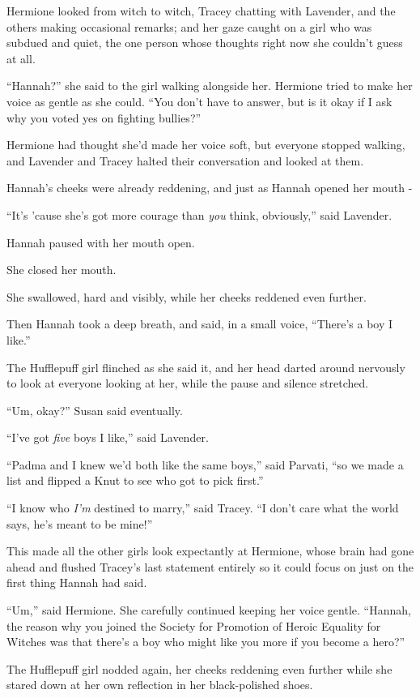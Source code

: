 Hermione looked from witch to witch, Tracey chatting with Lavender, and the others making occasional remarks; and her gaze caught on a girl who was subdued and quiet, the one person whose thoughts right now she couldn't guess at all.

``Hannah?'' she said to the girl walking alongside her. Hermione tried to make her voice as gentle as she could. ``You don't have to answer, but is it okay if I ask why you voted yes on fighting bullies?''

Hermione had thought she'd made her voice soft, but everyone stopped walking, and Lavender and Tracey halted their conversation and looked at them.

Hannah's cheeks were already reddening, and just as Hannah opened her mouth -

``It's 'cause she's got more courage than \emph{you} think, obviously,'' said Lavender.

Hannah paused with her mouth open.

She closed her mouth.

She swallowed, hard and visibly, while her cheeks reddened even further.

Then Hannah took a deep breath, and said, in a small voice, ``There's a boy I like.''

The Hufflepuff girl flinched as she said it, and her head darted around nervously to look at everyone looking at her, while the pause and silence stretched.

``Um, okay?'' Susan said eventually.

``I've got \emph{five} boys I like,'' said Lavender.

``Padma and I knew we'd both like the same boys,'' said Parvati, ``so we made a list and flipped a Knut to see who got to pick first.''

``I know who \emph{I'm} destined to marry,'' said Tracey. ``I don't care what the world says, he's meant to be mine!''

This made all the other girls look expectantly at Hermione, whose brain had gone ahead and flushed Tracey's last statement entirely so it could focus on just on the first thing Hannah had said.

``Um,'' said Hermione. She carefully continued keeping her voice gentle. ``Hannah, the reason why you joined the Society for Promotion of Heroic Equality for Witches was that there's a boy who might like you more if you become a hero?''

The Hufflepuff girl nodded again, her cheeks reddening even further while she stared down at her own reflection in her black-polished shoes.

